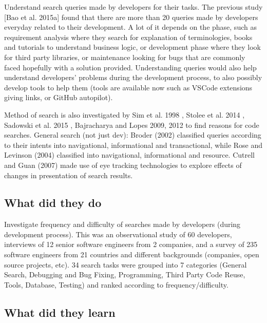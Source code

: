 Understand search queries made by developers for their tasks. The previous study [Bao et al. 2015a] \cite{baoTrackingAnalyzingCrossCutting2015} found that there are more than 20 queries made by developers everyday related to their development. A lot of it depends on the phase, such as requirement analysis where they search for explanation of terminologies, books and tutorials to understand business logic, or development phase where they look for third party libraries, or maintenance looking for bugs that are commonly faced hopefully with a solution provided. Understanding queries would also help understand developers' problems during the development process, to also possibly develop tools to help them (tools are available now such as VSCode extensions giving links, or GitHub autopilot).

Method of search is also investigated by Sim et al. 1998 \cite{simArchetypalSourceCode1998}, Stolee et al. 2014 \cite{stoleeSolvingSearchSource2014}, Sadowski et al. 2015 \cite{sadowskiHowDevelopersSearch2015}, Bajracharya and Lopes 2009, 2012 \cite{bajracharyaMiningSearchTopics2009,bajracharyaAnalyzingMiningCode2012} to find reasons for code searches. General search (not just dev): Broder (2002) \cite{broderTaxonomyWebSearch2002} classified queries according to their intents into navigational, informational and transactional, while Rose and Levinson (2004) \cite{roseUnderstandingUserGoals2004} classified into navigational, informational and resource. Cutrell and Guan (2007) \cite{cutrellWhatAreYou2007} made use of eye tracking technologies to explore effects of changes in presentation of search results.

\subsection{What did they do}

Investigate frequency and difficulty of searches made by developers (during development process). This was an observational study of 60 developers, interviews of 12 senior software engineers from 2 companies, and a survey of 235 software engineers from 21 countries and different backgrounds (companies, open source projects, etc). 34 search tasks were grouped into 7 categories (General Search, Debugging and Bug Fixing, Programming, Third Party Code Reuse, Tools, Database, Testing) and ranked according to frequency/difficulty.

\subsection{What did they learn}

